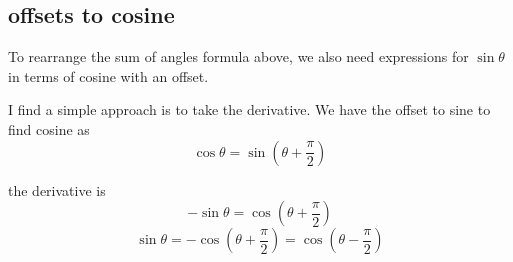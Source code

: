 \documentclass[11pt, oneside]{article}
\begin{document}
\subsection*{offsets to cosine}

To rearrange the sum of angles formula above, we also need expressions for $\sin \theta$ in terms of cosine with an offset.

I find a simple approach is to take the derivative.  We have the offset to sine to find cosine as 
\[ \cos \theta = \sin (\theta + \frac{\pi}{2}) \]

the derivative is 
\[ - \sin \theta = \cos (\theta + \frac{\pi}{2}) \]
\[ \sin \theta = - \cos (\theta + \frac{\pi}{2}) = \cos (\theta - \frac{\pi}{2}) \]
\end{document}
